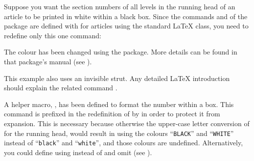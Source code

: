     \begin{Example}
      Suppose you want the section numbers of all levels in the running head 
      of an article to be printed in white within a black box. Since the 
      commands  and  of
      the  package are defined with 
       for articles using the standard \LaTeX{} 
       class, you need to redefine only this one command:
      The colour has been changed using the
       package. More details can be found
      in that package's manual (see \cite{package:xcolor}). 

      This example also uses an invisible strut. Any detailed \LaTeX{}
      introduction should explain the related command .

      A helper macro, , has been defined to format the number
      within a box. This command is prefixed in the redefinition of
       by  in order to protect it from
      expansion. This is necessary because otherwise the upper-case letter
      conversion of  for the running head, would result
      in using the colours ``\texttt{BLACK}'' and ``\texttt{WHITE}'' instead
      of ``\texttt{black}'' and ``\texttt{white}'', and those colours are
      undefined. Alternatively, you could define  using
       instead of  and omit
       (see \cite{latex:clsguide}).


\end{Example}
